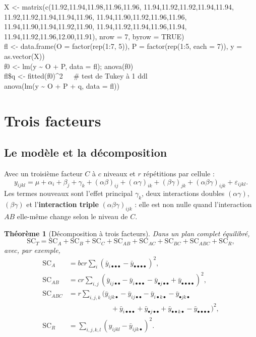 \documentclass[11pt,a4paper]{article}
\theoremstyle{sj}
\newtheorem{thm}{Théorème}
\theoremstyle{definition}
\theoremstyle{remark}
\newcommand{\SC}{\mathrm{SC}}
\newcommand{\ybar}{\bar y}
\newcommand{\dotp}{{\scriptscriptstyle\bullet}}
\begin{document}
\begin{code}
X <- matrix(c(11.92,11.94,11.98,11.96,11.96, 11.94,11.92,11.92,11.94,11.94,\\
\hspace*{2em}11.92,11.92,11.94,11.94,11.96, 11.94,11.90,11.92,11.96,11.96,\\
\hspace*{2em}11.94,11.90,11.94,11.92,11.90, 11.94,11.92,11.94,11.96,11.94,\\
\hspace*{2em}11.94,11.92,11.96,12.00,11.91), nrow = 7, byrow = TRUE)\\
fl <- data.frame(O = factor(rep(1:7, 5)), P = factor(rep(1:5, each = 7)), y = as.vector(X))\\
f0 <- lm(y \textasciitilde{} O + P, data = fl); anova(f0)\\
fl\$q <- fitted(f0)\textasciicircum2\ \ \ \# test de Tukey à 1 ddl\\
anova(lm(y \textasciitilde{} O + P + q, data = fl))
\end{code}

\section{Trois facteurs}\label{sec:trois}

\subsection{Le modèle et la décomposition}

Avec un troisième facteur $C$ à $c$ niveaux et $r$ répétitions par cellule :
\[
y_{ijkl}=\mu+\alpha_i+\beta_j+\gamma_k+(\alpha\beta)_{ij}+(\alpha\gamma)_{ik}+(\beta\gamma)_{jk}+(\alpha\beta\gamma)_{ijk}+\varepsilon_{ijkl}.
\]
Les termes nouveaux sont l'effet principal $\gamma_k$, deux interactions doubles $(\alpha\gamma)$, $(\beta\gamma)$ et l'\textbf{interaction triple} $(\alpha\beta\gamma)_{ijk}$ : elle est non nulle quand l'interaction $AB$ elle-même change selon le niveau de $C$.

\begin{thm}[Décomposition à trois facteurs]
Dans un plan complet équilibré,
\[
\SC_T=\SC_A+\SC_B+\SC_C+\SC_{AB}+\SC_{AC}+\SC_{BC}+\SC_{ABC}+\SC_R,
\]
avec, par exemple,
\begin{align*}
\SC_A&=bcr\sum_i(\ybar_{i\dotp\dotp\dotp}-\ybar_{\dotp\dotp\dotp\dotp})^2,\\
\SC_{AB}&=cr\sum_{i,j}(\ybar_{ij\dotp\dotp}-\ybar_{i\dotp\dotp\dotp}-\ybar_{\dotp j\dotp\dotp}+\ybar_{\dotp\dotp\dotp\dotp})^2,\\
\SC_{ABC}&=r\sum_{i,j,k}\big(\ybar_{ijk\dotp}-\ybar_{ij\dotp\dotp}-\ybar_{i\dotp k\dotp}-\ybar_{\dotp jk\dotp}\\&\hspace{6em}+\ybar_{i\dotp\dotp\dotp}+\ybar_{\dotp j\dotp\dotp}+\ybar_{\dotp\dotp k\dotp}-\ybar_{\dotp\dotp\dotp\dotp}\big)^2,\\
\SC_R&=\sum_{i,j,k,l}(y_{ijkl}-\ybar_{ijk\dotp})^2.
\end{align*}
\end{thm}
\end{document}
